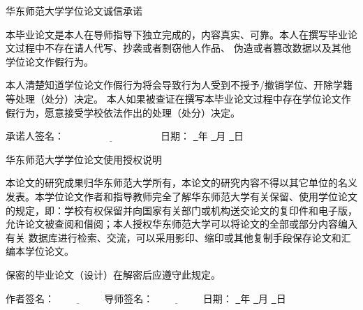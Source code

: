 	\thispagestyle{empty}
	
		\vspace*{1em}
		\linespread{1.6}
		\centerline{华东师范大学学位论文诚信承诺}
		
		\bigskip
		
		本毕业论文是本人在导师指导下独立完成的，内容真实、可靠。本人在撰写毕业论文过程中不存在请人代写、抄袭或者剽窃他人作品、
		伪造或者篡改数据以及其他学位论文作假行为。
		
		本人清楚知道学位论文作假行为将会导致行为人受到不授予/撤销学位、开除学籍等处理（处分）决定。
		本人如果被查证在撰写本毕业论文过程中存在学位论文作假行为，愿意接受学校依法作出的处理（处分）决定。		
		
		\vspace{2em}
		
		
		{承诺人签名}：$\underline{\hspace{4cm}}$ \hfill
		{日期}： \underline{\qquad\ }年 \underline{\quad\ }月 \underline{\quad\ }日 \qquad\mbox{}
		
		\vspace{4em}
		
		\centerline{华东师范大学学位论文使用授权说明}
		\bigskip
		
		
		本论文的研究成果归华东师范大学所有，本论文的研究内容不得以其它单位的名义发表。本学位论文作者和指导教师完全了解华东师范大学有关保留、使用学位论文
		的规定，即：学校有权保留并向国家有关部门或机构送交论文的复印件和电子版，允许论文被查阅和借阅；本人授权华东师范大学可以将论文的全部或部分内容编入有关
		数据库进行检索、交流，可以采用影印、缩印或其他复制手段保存论文和汇编本学位论文。
		
		保密的毕业论文（设计）在解密后应遵守此规定。

		\vspace{2em}
		
		{作者签名}：$\underline{\hspace{2cm}}$ \;\; 
		{导师签名}：$\underline{\hspace{2cm}}$\hfill
		{日期}： \underline{\qquad\ }年 \underline{\quad\ }月 \underline{\quad\ }日 \qquad\mbox{}
		

